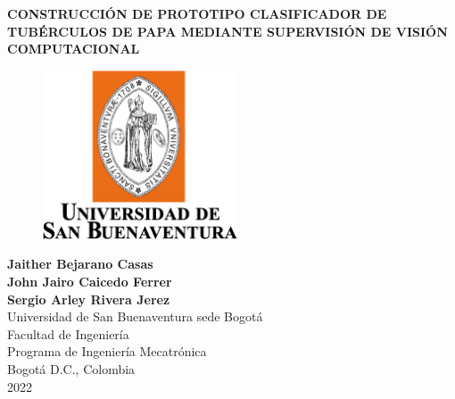 \cleardoublepage

\thispagestyle{empty} 
\begin{center}
\textbf{ 
\LARGE{CONSTRUCCIÓN DE PROTOTIPO CLASIFICADOR DE TUBÉRCULOS DE PAPA MEDIANTE SUPERVISIÓN DE VISIÓN COMPUTACIONAL}}\\[1cm]


\begin{figure}[htbp]
	\centering
		\includegraphics[height=5cm,keepaspectratio]{OtrosTex/LogoUSB}
\end{figure}

\vspace*{2cm} 
\Large\textbf{Jaither Bejarano Casas \\ John Jairo Caicedo Ferrer \\Sergio Arley Rivera Jerez}\\[1.0cm]

\vspace*{1.2cm} 
\Large{Universidad de San Buenaventura sede Bogotá}\\
\Large{Facultad de Ingeniería}\\
\Large{Programa de Ingeniería Mecatrónica}\\
\large{Bogotá D.C., Colombia\\
2022}\\
\end{center}

\newpage{\pagestyle{empty}\cleardoublepage}
\newpage
%
